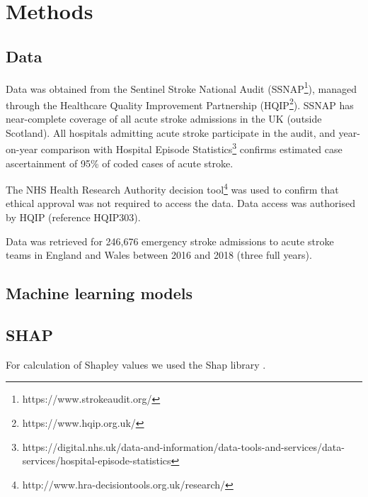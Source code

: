 \section{Methods}

\subsection{Data}

Data was obtained from the Sentinel Stroke National Audit (SSNAP\footnote{https://www.strokeaudit.org/}), managed through the Healthcare Quality Improvement Partnership (HQIP\footnote{https://www.hqip.org.uk/}). SSNAP has near-complete coverage of all acute stroke admissions in the UK (outside Scotland). All hospitals admitting acute stroke participate in the audit, and year-on-year comparison with Hospital Episode Statistics\footnote{https://digital.nhs.uk/data-and-information/data-tools-and-services/data-services/hospital-episode-statistics} confirms estimated case ascertainment of 95\% of coded cases of acute stroke.

The NHS Health Research Authority decision tool\footnote{http://www.hra-decisiontools.org.uk/research/} was used to confirm that ethical approval was not required to access the data. Data access was authorised by HQIP (reference HQIP303).

Data was retrieved for 246,676 emergency stroke admissions to acute stroke teams in England and Wales between 2016 and 2018 (three full years).


\subsection{Machine learning models}

\subsection{SHAP}

For calculation of Shapley values we used the Shap library \cite{lundberg_unified_2017}.